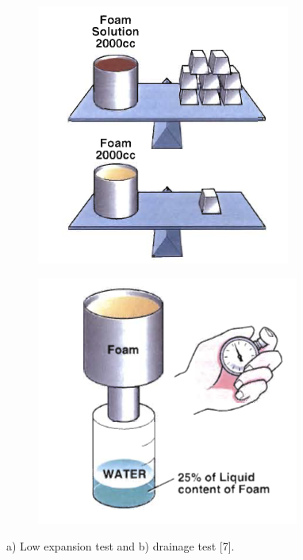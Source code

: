 \documentclass[12pt]{report}
\begin{document}
\begin{figure}[H]

\centering
\begin{subfigure}{.45\textwidth}
    \centering
    \includegraphics[width=\textwidth]{low_expansion_test.png}
    \caption{}
\end{subfigure}
\begin{subfigure}{.45\textwidth}
    \centering
    \includegraphics[width=\textwidth]{drainage_test.png}
    \caption{}
\end{subfigure}

\caption{a) Low expansion test and b) drainage test [7].}
\label{ch2:figure:tests}
\end{figure}
\end{document}
